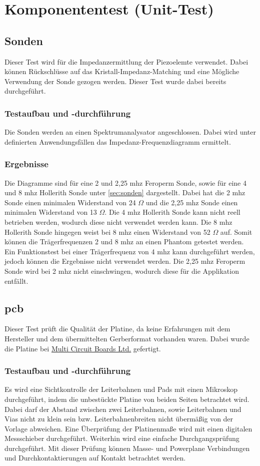 \section{Komponententest (Unit-Test)}
\subsection{Sonden}
Dieser Test wird für die Impedanzermittlung der Piezoelemte verwendet. Dabei können Rückschlüsse auf das Kristall-Impedanz-Matching und eine Mögliche Verwendung der Sonde gezogen werden. Dieser Test wurde dabei bereits durchgeführt.
\subsubsection*{Testaufbau und -durchführung}
Die Sonden werden an einen Spektrumanalysator angeschlossen. Dabei wird unter definierten Anwendungsfällen das Impedanz-Frequenzdiagramm ermittelt.
\subsubsection*{Ergebnisse}
Die Diagramme sind für eine 2 und 2,25 \ac{mhz} Feroperm Sonde, sowie für eine 4 und 8 \ac{mhz} Hollerith Sonde unter \autoref{sec:sonden} dargestellt. Dabei hat die 2 \ac{mhz} Sonde einen minimalen Widerstand von 24 $\Omega$ und die 2,25 \ac{mhz} Sonde einen minimalen Widerstand von 13 $\Omega$. Die 4 \ac{mhz} Hollerith Sonde kann nicht reell betrieben werden, wodurch diese nicht verwendet werden kann. Die 8 \ac{mhz} Hollerith Sonde hingegen weist bei 8 \ac{mhz} einen Widerstand von 52 $\Omega$ auf. Somit können die Trägerfrequenzen 2 und 8 \ac{mhz} an einen Phantom getestet werden. Ein Funktionstest bei einer Trägerfrequenz von 4 \ac{mhz} kann durchgeführt werden, jedoch können die Ergebnisse nicht verwendet werden. Die 2,25 \ac{mhz} Feroperm Sonde wird bei 2 \ac{mhz} nicht einschwingen, wodurch diese für die Applikation entfällt.
\subsection{\acl{pcb}}\label{sec:test:pcb}
Dieser Test prüft die Qualität der Platine, da keine Erfahrungen mit dem Hersteller und dem übermittelten Gerberformat vorhanden waren. Dabei wurde die Platine bei \href{http://www.multi-circuit-boards.eu/}{Multi Circuit Boards Ltd.} gefertigt.
\subsubsection*{Testaufbau und -durchführung}
Es wird eine Sichtkontrolle der Leiterbahnen und Pads mit einen Mikroskop durchgeführt, indem die unbestückte Platine von beiden Seiten betrachtet wird. Dabei darf der Abstand zwischen zwei Leiterbahnen, sowie Leiterbahnen und Vias  nicht zu klein sein bzw. Leiterbahnenbreiten nicht übermäßig von der Vorlage abweichen. Eine Überprüfung der Platinenmaße wird mit einen digitalen Messschieber durchgeführt. Weiterhin wird eine einfache Durchgangsprüfung durchgeführt. Mit dieser Prüfung können Masse- und Powerplane Verbindungen und Durchkontaktierungen auf Kontakt betrachtet werden.
